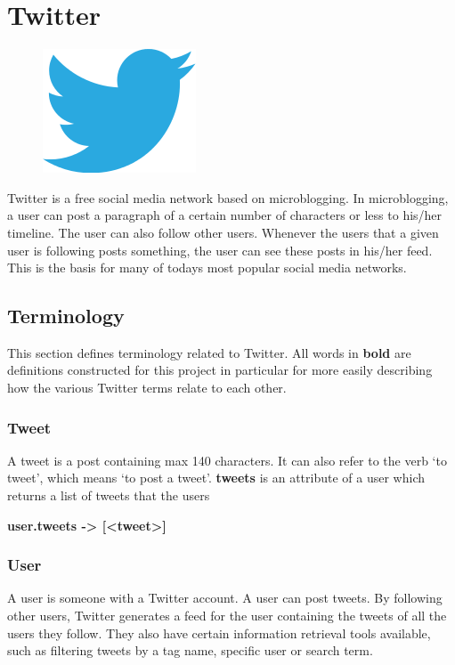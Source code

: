 \section{Twitter}\label{sec:twitter}

\begin{figure}
\vspace{-30pt}
\centering
\includegraphics[width = .25\textwidth]{image/twitter-logo.png}
\end{figure}
Twitter is a free social media network based on microblogging. In microblogging, a user can post a paragraph of a certain number of characters or less to his/her timeline. The user can also follow other users. Whenever the users that a given user is following posts something, the user can see these posts in his/her feed. This is the basis for many of todays most popular social media networks.

\subsection{Terminology}
This section defines terminology related to Twitter. All words in \textbf{bold} are definitions constructed for this project in particular for more easily describing how the various Twitter terms relate to each other.

\subsubsection{Tweet}
A tweet is a post containing max 140 characters. It can also refer to the verb ‘to tweet’, which means ‘to post a tweet’. \textbf{tweets} is an attribute of a user which returns a list of tweets that the users

  \textbf{user.tweets -> [<tweet>]}
\subsubsection{User}
A user is someone with a Twitter account. A user can post tweets. By following other users, Twitter generates a feed for the user containing the tweets of all the users they follow. They also have certain information retrieval tools available, such as filtering tweets by a tag name, specific user or search term.

